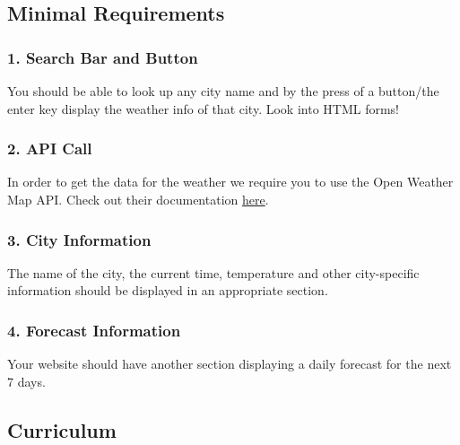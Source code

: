 \documentclass[
]{article}
\begin{document}
\hypertarget{minimal-requirements}{%
\subsection{Minimal Requirements}\label{minimal-requirements}}

\hypertarget{search-bar-and-button}{%
\subsubsection*{1. Search Bar and Button}\label{search-bar-and-button}}

You should be able to look up any city name and by the press of a button/the enter key display the weather info of that city. Look into HTML forms!

\hypertarget{api-call}{%
\subsubsection*{2. API Call}\label{api-call}}

In order to get the data for the weather we require you to use the Open Weather Map API. Check out their documentation \href{https://openweathermap.org/appid}{here}.

\hypertarget{city-information}{%
\subsubsection*{3. City Information}\label{city-information}}

The name of the city, the current time, temperature and other city-specific information should be displayed in an appropriate section.

\hypertarget{forecast-information}{%
\subsubsection*{4. Forecast Information}\label{forecast-information}}

Your website should have another section displaying a daily forecast for the next 7 days.

\hypertarget{curriculum}{%
\subsection{Curriculum}\label{curriculum}}
\end{document}
